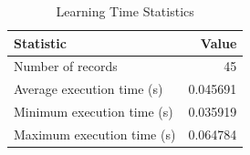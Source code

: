 
\begin{table}[h!]
\centering
\begin{tabular}{l r}
\hline
Statistic & Value \\
\hline
Number of records & 45 \\
Average execution time (s) & 0.045691 \\
Minimum execution time (s) & 0.035919 \\
Maximum execution time (s) & 0.064784 \\
\hline
\end{tabular}
\caption{Learning Time Statistics}
\end{table}
